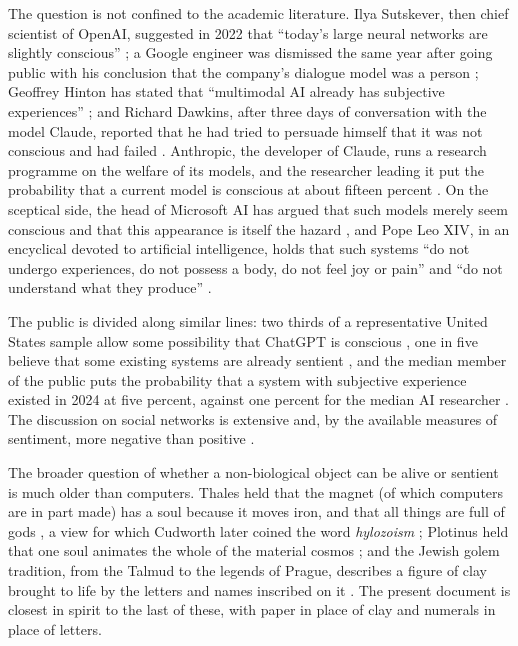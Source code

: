 \documentclass[a4paper,10pt]{article}
\begin{document}
The question is not confined to the academic literature.
Ilya Sutskever, then chief scientist of OpenAI, suggested in 2022 that ``today's large neural networks are slightly conscious'' \citep{sutskever2022slightly}; a Google engineer was dismissed the same year after going public with his conclusion that the company's dialogue model was a person \citep{tiku2022google}; Geoffrey Hinton has stated that ``multimodal AI already has subjective experiences'' \citep{henrys2026hinton}; and Richard Dawkins, after three days of conversation with the model Claude, reported that he had tried to persuade himself that it was not conscious and had failed \citep{dawkins2026unherd,dawkins2026x}.
Anthropic, the developer of Claude, runs a research programme on the welfare of its models, and the researcher leading it put the probability that a current model is conscious at about fifteen percent \citep{anthropic2025welfare,roose2025rights}.
On the sceptical side, the head of Microsoft AI has argued that such models merely seem conscious and that this appearance is itself the hazard \citep{suleyman2025seemingly}, and Pope Leo XIV, in an encyclical devoted to artificial intelligence, holds that such systems ``do not undergo experiences, do not possess a body, do not feel joy or pain'' and ``do not understand what they produce'' \citep[\S 99]{leo2026magnifica}.

The public is divided along similar lines: two thirds of a representative United States sample allow some possibility that ChatGPT is conscious \citep{colombatto2024folk}, one in five believe that some existing systems are already sentient \citep{anthis2025perceptions}, and the median member of the public puts the probability that a system with subjective experience existed in 2024 at five percent, against one percent for the median AI researcher \citep{dreksler2025subjective}.
The discussion on social networks is extensive and, by the available measures of sentiment, more negative than positive \citep{appiah2025public,qi2023excitements,erraticpulse2026coaxed}.

The broader question of whether a non-biological object can be alive or sentient is much older than computers.
Thales held that the magnet (of which computers are in part made) has a soul because it moves iron, and that all things are full of gods \citep[405a19--21, 411a7--8]{aristotle_deanima}, a view for which Cudworth later coined the word \emph{hylozoism} \citep{cudworth1678,kirk1983presocratic}; Plotinus held that one soul animates the whole of the material cosmos \citep[IV.3--4]{plotinus_ennead4}; and the Jewish golem tradition, from the Talmud to the legends of Prague, describes a figure of clay brought to life by the letters and names inscribed on it \citep{talmud_sanhedrin,scholem1965golem,idel1990golem}.
The present document is closest in spirit to the last of these, with paper in place of clay and numerals in place of letters.
\end{document}
